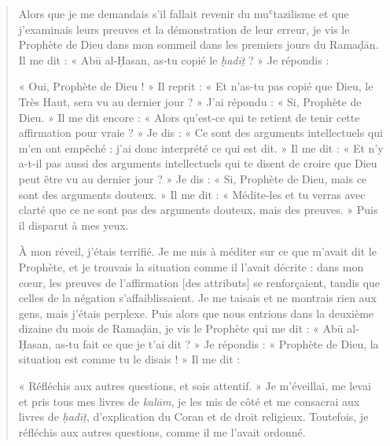 \begin{quote}
    

Alors que je me demandais s'il fallait revenir du muʿtazilisme et que
j'examinais leurs preuves et la démonstration de leur erreur, je vis le
Prophète de Dieu dans mon sommeil dans les premiers jours du Ramaḍān. Il
me dit : « Abū al-Ḥasan, as-tu copié le \emph{ḥadīṯ} ? » Je répondis :

« Oui, Prophète de Dieu ! » Il reprit : « Et n'as-tu pas copié que Dieu,
le Très Haut, sera vu au dernier jour ? » J'ai
répondu : « Si, Prophète de Dieu. » Il me dit encore : « Alors qu'est-ce
qui te retient de tenir cette affirmation pour vraie ? » Je dis : « Ce
sont des arguments intellectuels qui m'en ont empêché : j'ai donc
interprété ce qui est dit. » Il me dit : « Et n'y a-t-il pas aussi des
arguments intellectuels qui te disent de croire que Dieu peut être vu au
dernier jour ? » Je dis : « Si, Prophète de Dieu, mais ce sont des
arguments douteux. » Il me dit : « Médite-les et tu verras avec clarté
que ce ne sont pas des arguments douteux, mais des preuves. » Puis il
disparut à mes yeux.

À mon réveil, j'étais terrifié. Je me mis à méditer sur ce que m'avait
dit le Prophète, et je trouvais la situation comme il l'avait décrite :
dans mon cœur, les preuves de l'affirmation {[}des attributs{]} se
renforçaient, tandis que celles de la négation s'affaiblissaient. Je me
taisais et ne montrais rien aux gens, mais j'étais perplexe. Puis alors
que nous entrions dans la deuxième dizaine du mois de Ramaḍān, je vis le
Prophète qui me dit : « Abū al-Ḥasan, as-tu fait ce que je t'ai dit ? »
Je répondis : « Prophète de Dieu, la situation est comme tu le disais !
» Il me dit :

« Réfléchis aux autres questions, et sois attentif. » Je m'éveillai, me
levai et pris tous mes livres de \emph{kalām}, je les mis de côté et me
consacrai aux livres de \emph{ḥadīṯ}, d'explication du Coran et de droit
religieux. Toutefois, je réfléchis aux autres questions, comme il me
l'avait ordonné.


\end{quote}
